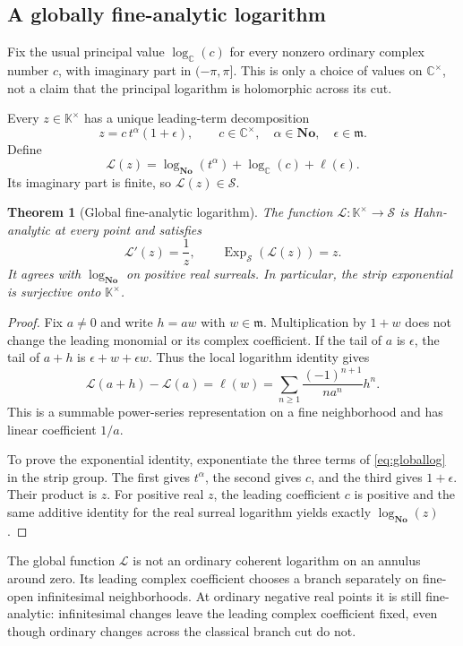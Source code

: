 \documentclass[11pt,a4paper]{article}
\numberwithin{equation}{section}
\newtheorem{theorem}{Theorem}[section]
\theoremstyle{definition}
\theoremstyle{remark}
\newcommand{\No}{\mathbf{No}}
\newcommand{\K}{\mathbb K}
\newcommand{\C}{\mathbb C}
\newcommand{\mm}{\mathfrak m}
\newcommand{\Logg}{\mathcal L}
\begin{document}
\subsection{A globally fine-analytic logarithm}
Fix the usual principal value $\log_{\C}(c)$ for every nonzero ordinary complex number $c$, with imaginary part in $(-\pi,\pi]$. This is only a choice of values on $\C^\times$, not a claim that the principal logarithm is holomorphic across its cut.

Every $z\in\K^\times$ has a unique leading-term decomposition
\[
 z=c\,t^\alpha(1+\epsilon),
 \qquad c\in\C^\times,\quad\alpha\in\No,\quad\epsilon\in\mm.
\]
Define
\begin{equation}
\label{eq:globallog}
 \Logg(z)=\log_{\No}(t^\alpha)+\log_{\C}(c)+\ell(\epsilon).
\end{equation}
Its imaginary part is finite, so $\Logg(z)\in\mathcal S$.

\begin{theorem}[Global fine-analytic logarithm]
\label{thm:globallog}
The function $\Logg:\K^\times\to\mathcal S$ is Hahn-analytic at every point and satisfies
\[
 \Logg'(z)=\frac1z,
 \qquad
 \operatorname{Exp}_{\mathcal S}(\Logg(z))=z.
\]
It agrees with $\log_{\No}$ on positive real surreals. In particular, the strip exponential is surjective onto $\K^\times$.
\end{theorem}
\begin{proof}
Fix $a\ne0$ and write $h=aw$ with $w\in\mm$. Multiplication by $1+w$ does not change the leading monomial or its complex coefficient. If the tail of $a$ is $\epsilon$, the tail of $a+h$ is $\epsilon+w+\epsilon w$. Thus the local logarithm identity gives
\[
 \Logg(a+h)-\Logg(a)=\ell(w)
 =\sum_{n\geq1}\frac{(-1)^{n+1}}{n a^n}h^n.
\]
This is a summable power-series representation on a fine neighborhood and has linear coefficient $1/a$.

To prove the exponential identity, exponentiate the three terms of \eqref{eq:globallog} in the strip group. The first gives $t^\alpha$, the second gives $c$, and the third gives $1+\epsilon$. Their product is $z$. For positive real $z$, the leading coefficient $c$ is positive and the same additive identity for the real surreal logarithm yields exactly $\log_{\No}(z)$.
\end{proof}

The global function $\Logg$ is not an ordinary coherent logarithm on an annulus around zero. Its leading complex coefficient chooses a branch separately on fine-open infinitesimal neighborhoods. At ordinary negative real points it is still fine-analytic: infinitesimal changes leave the leading complex coefficient fixed, even though ordinary changes across the classical branch cut do not.
\end{document}
